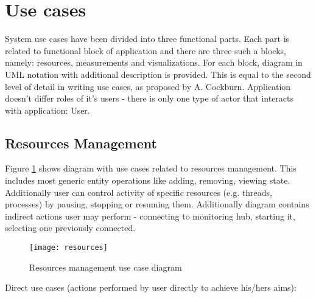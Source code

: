 %


\section{Use cases}
\label{sec:ch4_usecases}

System use cases have been divided into three functional parts. Each part is related to functional block of
application and there are three such a blocks, namely: resources, measurements and visualizations. For each block,
diagram in UML notation with additional description is provided. This is equal to the second level of detail in
writing use cases, as proposed by A. Cockburn\cite{0201702258}. Application doesn't differ roles of it's users - there
is only one type of actor that interacts with application: User.

\pagebreak

\subsection{Resources Management}
\label{subsec:resources_mgmnt}

Figure \ref{fig:usecase_resources} shows diagram with use cases related to resources management. This includes most
generic entity operations like adding, removing, viewing state. Additionally user can control activity of specific
resources (e.g. threads, processes) by pausing, stopping or resuming them. Additionally diagram contains indirect
actions user may perform - connecting to monitoring hub, starting it, selecting one previously connected.

\begin{figure}[ht]
  \centering
  \texttt{[image: resources]}
  \caption{Resources management use case diagram}
  \label{fig:usecase_resources}
\end{figure}

Direct use cases (actions performed by user directly to achieve his/hers aims):

